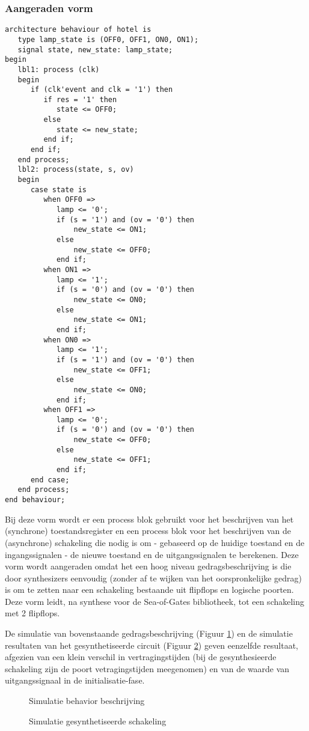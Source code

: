\subsubsection{Aangeraden vorm}
\begin{small}
\begin{verbatim}
architecture behaviour of hotel is
   type lamp_state is (OFF0, OFF1, ON0, ON1);
   signal state, new_state: lamp_state;
begin
   lbl1: process (clk)
   begin
      if (clk'event and clk = '1') then
         if res = '1' then
            state <= OFF0;
         else
            state <= new_state;
         end if;
      end if;
   end process;
   lbl2: process(state, s, ov)
   begin
      case state is
         when OFF0 =>
            lamp <= '0';
            if (s = '1') and (ov = '0') then
                new_state <= ON1;
            else
                new_state <= OFF0;
            end if;
         when ON1 =>
            lamp <= '1';
            if (s = '0') and (ov = '0') then
                new_state <= ON0;
            else
                new_state <= ON1;
            end if;
         when ON0 =>
            lamp <= '1';
            if (s = '1') and (ov = '0') then
                new_state <= OFF1;
            else
                new_state <= ON0;
            end if;
         when OFF1 =>
            lamp <= '0';
            if (s = '0') and (ov = '0') then
                new_state <= OFF0;
            else
                new_state <= OFF1;
            end if;
      end case;
   end process;
end behaviour;
\end{verbatim}
\end{small}
Bij deze vorm wordt er een process blok gebruikt voor het beschrijven van
het (synchrone) toestands\-register en een process blok voor het beschrijven van de 
(asynchrone) schakeling die nodig is om - gebaseerd op de huidige toestand en de
ingangssignalen - de nieuwe toestand en de uitgangssignalen 
te berekenen.
Deze vorm wordt aangeraden omdat het een hoog niveau gedragsbeschrijving is 
die door synthesizers eenvoudig (zonder af te wijken van het
oorspronkelijke gedrag) is om te zetten naar
een schakeling bestaande uit flipflops en logische poorten.
Deze vorm leidt, na synthese voor de Sea-of-Gates bibliotheek, tot een schakeling
met 2 flipflops.

De simulatie van bovenstaande gedragsbeschrijving (Figuur \ref{figuur:vhdlsim1})
en de simulatie resultaten van het gesynthetiseerde circuit (Figuur \ref{figuur:vhdlsim1b})
geven eenzelfde resultaat,
afgezien van een klein verschil in vertragingstijden
(bij de gesynthesieerde schakeling zijn de poort vetragingstijden meegenomen)
en van de waarde van uitgangssignaal in de initialisatie-fase.
\begin{figure}[bth]
\centerline{}
\caption{Simulatie behavior beschrijving}
\label{figuur:vhdlsim1}
\end{figure}
\begin{figure}[bth]
\centerline{}
\caption{Simulatie gesynthetiseerde schakeling}
\label{figuur:vhdlsim1b}
\end{figure}

